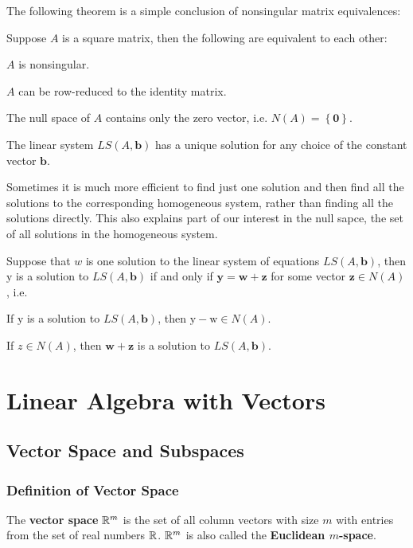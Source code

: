 \documentclass[a4paper,12pt]{article}
\begin{document}
The following theorem is a simple conclusion of nonsingular matrix equivalences:\n

\begin{pst}
  Suppose $A$ is a square matrix, then the following are equivalent to each other:

  \begin{alist}
    \item $A$ is nonsingular.
    \item $A$ can be row-reduced to the identity matrix.
    \item The null space of $A$ contains only the zero vector, i.e. $N(A)=\left\{ \mathbf{0}\right\}$.
    \item The linear system $LS(A,\mathbf{b})$ has a unique solution for any choice of the constant vector $\mathbf{b}$.
  \end{alist}
\end{pst}\n

Sometimes it is much more efficient to find just one solution and then find all the solutions to the corresponding homogeneous system, rather than finding all the solutions directly. This also explains part of our interest in the null sapce, the set of all solutions in the homogeneous system.\n

\begin{thm}
  Suppose that $w$ is one solution to the linear system of equations $LS(A,\mathbf{b})$, then $\mathrm{y}$ is a solution to $LS(A,\mathbf{b})$ if and only if $\mathbf{y}=\mathbf{w}+\mathbf{z}$ for some vector $\mathbf{z}\in N(A)$, i.e.

  \begin{alist}
    \item If $\mathrm{y}$ is a solution to $LS(A,\mathbf{b})$, then $\mathrm{y}-\mathrm{w}\in N(A)$.
    \item If $z\in N(A)$, then $\mathbf{w}+\mathbf{z}$ is a solution to $LS(A,\mathbf{b})$.
  \end{alist}
\end{thm}

\pagebreak

\section{Linear Algebra with Vectors}
\subsection{Vector Space and Subspaces}
\subsubsection{Definition of Vector Space}
\begin{dft}
  The \textbf{vector space} $\mathbb{R}^{m}$ is the set of all column vectors with size $m$ with entries from the set of real numbers $\mathbb{R}$. $\mathbb{R}^{m}$ is also called the \textbf{Euclidean $m$-space}.
\end{dft}\n
\end{document}
